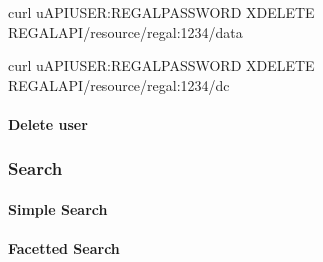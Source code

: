 \documentclass[letterpaper,10pt,english]{sphinxmanual}
\begin{document}
\begin{sphinxVerbatim}[commandchars=\\\{\}]
curl \PYGZhy{}u\PYGZdl{}API\PYGZus{}USER:\PYGZdl{}REGAL\PYGZus{}PASSWORD \PYGZhy{}XDELETE \PYGZdl{}REGAL\PYGZus{}API/resource/regal:1234/data
\end{sphinxVerbatim}

\begin{sphinxVerbatim}[commandchars=\\\{\}]
curl \PYGZhy{}u\PYGZdl{}API\PYGZus{}USER:\PYGZdl{}REGAL\PYGZus{}PASSWORD \PYGZhy{}XDELETE \PYGZdl{}REGAL\PYGZus{}API/resource/regal:1234/dc
\end{sphinxVerbatim}


\paragraph{Delete user}
\label{\detokenize{api-toscience:delete-user}}\label{\detokenize{api-toscience:id26}}
\begin{sphinxVerbatim}[commandchars=\\\{\}]
 
\end{sphinxVerbatim}


\subsubsection{Search}
\label{\detokenize{api-toscience:search}}\label{\detokenize{api-toscience:id27}}

\paragraph{Simple Search}
\label{\detokenize{api-toscience:simple-search}}\label{\detokenize{api-toscience:id28}}
\begin{sphinxVerbatim}[commandchars=\\\{\}]
 
\end{sphinxVerbatim}

\begin{sphinxVerbatim}[commandchars=\\\{\}]
 
\end{sphinxVerbatim}


\paragraph{Facetted Search}
\label{\detokenize{api-toscience:facetted-search}}\label{\detokenize{api-toscience:id29}}
\end{document}
